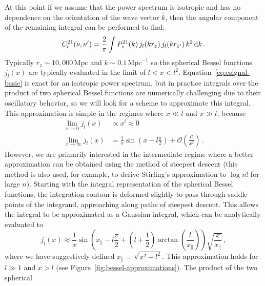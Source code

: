 \documentclass[twocolumn]{aastex62}
\renewcommand{\d}{{\rm d}}
\begin{document}
At this point if we assume that the power spectrum is isotropic and has no dependence on the
orientation of the wave vector $\hat k$, then the angular component of the remaining integral can be
performed to find:
\begin{equation}\label{eq:csignal-basic}
    C^{21}_l(\nu, \nu^\prime) =
        \frac{2}{\pi}
        \int
        P_z^{21}(k) \,
        j_l(k r_z) \,
        j_l(k r_{z^\prime}) \,
        k^2 \, \d k\,.
\end{equation}
Typically $r_z\sim 10,000\,\text{Mpc}$ and $k\sim 0.1\,\text{Mpc}^{-1}$ so the spherical Bessel
functions $j_l(x)$ are typically evaluated in the limit of $l < x < l^2$.
Equation~\ref{eq:csignal-basic} is exact for an isotropic power spectrum, but in practice integrals
over the product of two spherical Bessel functions are numerically challenging due to their
oscillatory behavior, so we will look for a scheme to approximate this integral.  This approximation
is simple in the regimes where $x \ll l$ and $x \gg l$, because
\begin{align}
    \lim_{x\rightarrow 0} j_l(x) &\propto x^l \approx 0 \\
    \lim_{x\rightarrow\infty} j_l(x) &=
        \frac{1}{x} \sin\left(x - l\frac{\pi}{2}\right)
        + \mathcal{O}\left(\frac{l^2}{x^2}\right)
    \,.
\end{align}
However, we are primarily interested in the intermediate regime where a better approximation can be
obtained using the method of steepest descent (this method is also used, for example, to derive
Stirling's approximation to $\log n!$ for large $n$). Starting with the integral representation of
the spherical Bessel functions, the integration contour is deformed slightly to pass through saddle
points of the integrand, approaching along paths of steepest descent. This allows the integral to be
approximated as a Gaussian integral, which can be analytically evaluated to
\begin{equation}
    j_l(x) \approx
        \frac{1}{x}
        \sin\left(
            x_\parallel - l\frac{\pi}{2}
            + \left(l+\frac{1}{2}\right)\arctan\left(\frac{l}{x_\parallel}\right)
        \right)
        \sqrt{\frac{x}{x_\parallel}}
    \,,
\end{equation}
where we have suggestively defined $x_\parallel = \sqrt{x^2-l^2}$.  This approximation holds for
$l\gg 1$ and $x > l$ (see Figure~\ref{fig:bessel-approximations}). The product of the two spherical
\end{document}
